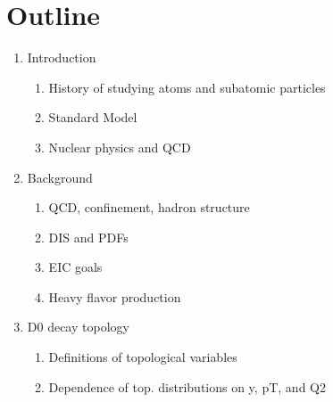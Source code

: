 \chapter{Outline}

\begin{enumerate}
    \item Introduction
    \begin{enumerate}
        \item History of studying atoms and subatomic particles
        \item Standard Model
        \item Nuclear physics and QCD
    \end{enumerate}
    
    \item Background
    \begin{enumerate}
        \item QCD, confinement, hadron structure
        \item DIS and PDFs
        \item EIC goals
        \item Heavy flavor production
    \end{enumerate}
    
    

    \item D0 decay topology
    \begin{enumerate}
        \item Definitions of topological variables
        \item Dependence of top. distributions on y, pT, and Q2
    \end{enumerate}


\end{enumerate}

